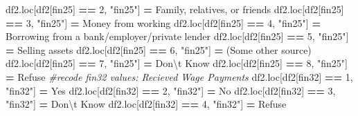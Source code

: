 \documentclass[water,article,submit,moreauthors,pdftex]{mdpi}
\newenvironment{Shaded}{\begin{snugshade}}{\end{snugshade}}
\newcommand{\CharTok}[1]{\textcolor[rgb]{0.31,0.60,0.02}{#1}}
\newcommand{\CommentTok}[1]{\textcolor[rgb]{0.56,0.35,0.01}{\textit{#1}}}
\newcommand{\DecValTok}[1]{\textcolor[rgb]{0.00,0.00,0.81}{#1}}
\newcommand{\NormalTok}[1]{#1}
\newcommand{\OperatorTok}[1]{\textcolor[rgb]{0.81,0.36,0.00}{\textbf{#1}}}
\newcommand{\StringTok}[1]{\textcolor[rgb]{0.31,0.60,0.02}{#1}}
\begin{document}
\begin{Shaded}
\begin{Highlighting}[]
\NormalTok{df2.loc[df2[}\StringTok{\textquotesingle{}fin25\textquotesingle{}}\NormalTok{] }\OperatorTok{==} \DecValTok{2}\NormalTok{, }\StringTok{"fin25"}\NormalTok{] }\OperatorTok{=} \StringTok{\textquotesingle{}Family, relatives, or friends\textquotesingle{}}
\NormalTok{df2.loc[df2[}\StringTok{\textquotesingle{}fin25\textquotesingle{}}\NormalTok{] }\OperatorTok{==} \DecValTok{3}\NormalTok{, }\StringTok{"fin25"}\NormalTok{] }\OperatorTok{=} \StringTok{\textquotesingle{}Money from working\textquotesingle{}}
\NormalTok{df2.loc[df2[}\StringTok{\textquotesingle{}fin25\textquotesingle{}}\NormalTok{] }\OperatorTok{==} \DecValTok{4}\NormalTok{, }\StringTok{"fin25"}\NormalTok{] }\OperatorTok{=} \StringTok{\textquotesingle{}Borrowing from a bank/employer/private lender\textquotesingle{}}
\NormalTok{df2.loc[df2[}\StringTok{\textquotesingle{}fin25\textquotesingle{}}\NormalTok{] }\OperatorTok{==} \DecValTok{5}\NormalTok{, }\StringTok{"fin25"}\NormalTok{] }\OperatorTok{=} \StringTok{\textquotesingle{}Selling assets\textquotesingle{}}
\NormalTok{df2.loc[df2[}\StringTok{\textquotesingle{}fin25\textquotesingle{}}\NormalTok{] }\OperatorTok{==} \DecValTok{6}\NormalTok{, }\StringTok{"fin25"}\NormalTok{] }\OperatorTok{=} \StringTok{\textquotesingle{}(Some other source)\textquotesingle{}}
\NormalTok{df2.loc[df2[}\StringTok{\textquotesingle{}fin25\textquotesingle{}}\NormalTok{] }\OperatorTok{==} \DecValTok{7}\NormalTok{, }\StringTok{"fin25"}\NormalTok{] }\OperatorTok{=} \StringTok{\textquotesingle{}Don}\CharTok{\textbackslash{}\textquotesingle{}}\StringTok{t Know\textquotesingle{}}
\NormalTok{df2.loc[df2[}\StringTok{\textquotesingle{}fin25\textquotesingle{}}\NormalTok{] }\OperatorTok{==} \DecValTok{8}\NormalTok{, }\StringTok{"fin25"}\NormalTok{] }\OperatorTok{=} \StringTok{\textquotesingle{}Refuse\textquotesingle{}}
\CommentTok{\#recode fin32 values: Recieved Wage Payments}
\NormalTok{df2.loc[df2[}\StringTok{\textquotesingle{}fin32\textquotesingle{}}\NormalTok{] }\OperatorTok{==} \DecValTok{1}\NormalTok{, }\StringTok{"fin32"}\NormalTok{] }\OperatorTok{=} \StringTok{\textquotesingle{}Yes\textquotesingle{}}
\NormalTok{df2.loc[df2[}\StringTok{\textquotesingle{}fin32\textquotesingle{}}\NormalTok{] }\OperatorTok{==} \DecValTok{2}\NormalTok{, }\StringTok{"fin32"}\NormalTok{] }\OperatorTok{=} \StringTok{\textquotesingle{}No\textquotesingle{}}
\NormalTok{df2.loc[df2[}\StringTok{\textquotesingle{}fin32\textquotesingle{}}\NormalTok{] }\OperatorTok{==} \DecValTok{3}\NormalTok{, }\StringTok{"fin32"}\NormalTok{] }\OperatorTok{=} \StringTok{\textquotesingle{}Don}\CharTok{\textbackslash{}\textquotesingle{}}\StringTok{t Know\textquotesingle{}}
\NormalTok{df2.loc[df2[}\StringTok{\textquotesingle{}fin32\textquotesingle{}}\NormalTok{] }\OperatorTok{==} \DecValTok{4}\NormalTok{, }\StringTok{"fin32"}\NormalTok{] }\OperatorTok{=} \StringTok{\textquotesingle{}Refuse\textquotesingle{}}


\end{Highlighting}
\end{Shaded}
\end{document}
